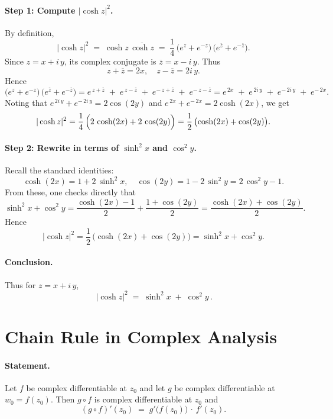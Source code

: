 \documentclass[12pt]{article}
\theoremstyle{definition} %
\theoremstyle{plain} %
\begin{document}
\paragraph{Step 1: Compute $|\cosh z|^2$.}
By definition,
\[
|\cosh z|^2
\;=\;
\cosh z \,\overline{\cosh z}
\;=\;
\frac{1}{4}\,\bigl(e^z + e^{-z}\bigr)\,\bigl(e^{\overline{z}} + e^{-\overline{z}}\bigr).
\]
Since $z = x + i\,y$, its complex conjugate is $\overline{z} = x - i\,y$. Thus
\[
z + \overline{z} = 2x,
\quad
z - \overline{z} = 2i\,y.
\]
Hence
\[
\bigl(e^z + e^{-z}\bigr)\,\bigl(e^{\overline{z}} + e^{-\overline{z}}\bigr)
=
e^{\,z + \overline{z}} \;+\; e^{\,z - \overline{z}} \;+\; e^{-\,z + \overline{z}} \;+\; e^{-\,z - \overline{z}}
=
e^{\,2x} \;+\; e^{\,2i\,y} \;+\; e^{-\,2i\,y} \;+\; e^{-\,2x}.
\]
Noting that $e^{\,2i\,y} + e^{-\,2i\,y} = 2\cos(2y)$ and $e^{\,2x} + e^{-\,2x} = 2\cosh(2x)$, we get
\[
|\cosh z|^2 
= \frac{1}{4}\,\Bigl(2\,\cosh(2x) + 2\,\cos(2y)\Bigr)
= \frac{1}{2}\,\bigl(\cosh(2x) + \cos(2y)\bigr).
\]

\paragraph{Step 2: Rewrite in terms of $\sinh^2 x$ and $\cos^2 y$.}
Recall the standard identities:
\[
\cosh(2x) 
= 1 + 2\,\sinh^2 x,
\quad
\cos(2y) 
= 1 - 2\,\sin^2 y 
= 2\,\cos^2 y - 1.
\]
From these, one checks directly that
\[
\sinh^2 x + \cos^2 y
= \frac{\cosh(2x) - 1}{2} + \frac{1 + \cos(2y)}{2}
= \frac{\cosh(2x) + \cos(2y)}{2}.
\]
Hence
\[
|\cosh z|^2 
= \frac{1}{2}\,\bigl(\cosh(2x) + \cos(2y)\bigr)
= \sinh^2 x + \cos^2 y.
\]

\paragraph{Conclusion.} 
Thus for $z = x + i\,y$,
\[
\boxed{\,|\cosh z|^2 \;=\; \sinh^2 x \;+\; \cos^2 y\,}.
\]
\section*{Chain Rule in Complex Analysis}

\paragraph{Statement.}
Let $f$ be complex differentiable at $z_0$ and let $g$ be complex differentiable at $w_0 = f(z_0)$. Then $g \circ f$ is complex differentiable at $z_0$ and
\[
(g \circ f)'(z_0) \;=\; g'\bigl(f(z_0)\bigr)\,\cdot\,f'(z_0).
\]
\end{document}
